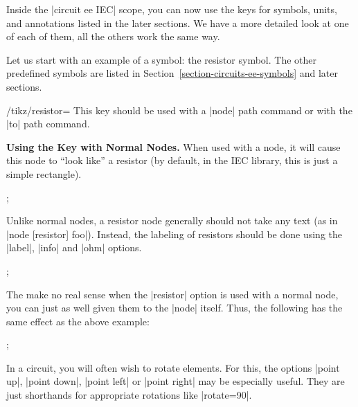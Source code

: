Inside the |circuit ee IEC| scope, you can now use the keys for
symbols, units, and annotations listed in the later sections. We have
a more detailed look at one of each of them, all the others work the
same way.

Let us start with an example of a symbol: the resistor symbol. The
other predefined symbols are listed in
Section~\ref{section-circuits-ee-symbols} and later sections.

\begin{key}{/tikz/resistor=}
  This key should be used with a |node| path command or with the |to|
  path command.

  \medskip\textbf{Using the Key with Normal Nodes.}
  When used with a node, it will cause this node to
  ``look like'' a resistor (by default, in the IEC library, this is
  just a simple rectangle).
\begin{codeexample}[]
  \node [resistor] {};
\end{codeexample}

  Unlike normal nodes, a resistor node generally should not take any
  text (as in |node [resistor] {foo}|). Instead, the labeling of
  resistors should be done using the |label|, |info| and |ohm|
  options.
\begin{codeexample}[]
  \node [resistor,ohm=5] {};
\end{codeexample}

  The  make no real sense when the |resistor| option is
  used with a normal node, you can just as well given them to the
  |node| itself. Thus, the following has the same effect as the above
  example:
\begin{codeexample}[]
  \node [resistor={ohm=5}] {};
\end{codeexample}

  In a circuit, you will often wish to rotate elements. For this, the
  options |point up|, |point down|, |point left| or |point right| may
  be especially useful. They are just shorthands for appropriate
  rotations like |rotate=90|.
\begin{codeexample}[]
\end{codeexample}


\end{key}
